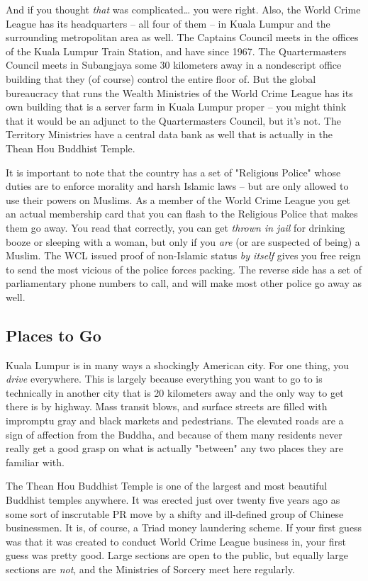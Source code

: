 And if you thought \textit{that} was complicated\ldots{} you were right. Also, the World Crime League has its headquarters -- all four of them -- in Kuala Lumpur and the surrounding metropolitan area as well. The Captains Council meets in the offices of the Kuala Lumpur Train Station, and have since 1967. The Quartermasters Council meets in Subangjaya some 30 kilometers away in a nondescript office building that they (of course) control the entire floor of. But the global bureaucracy that runs the Wealth Ministries of the World Crime League has its own building that is a server farm in Kuala Lumpur proper -- you might think that it would be an adjunct to the Quartermasters Council, but it's not. The Territory Ministries have a central data bank as well that is actually in the Thean Hou Buddhist Temple.

It is important to note that the country has a set of "Religious Police" whose duties are to enforce morality and harsh Islamic laws -- but are only allowed to use their powers on Muslims. As a member of the World Crime League you get an actual membership card that you can flash to the Religious Police that makes them go away. You read that correctly, you can get \textit{thrown in jail} for drinking booze or sleeping with a woman, but only if you \textit{are} (or are suspected of being) a Muslim. The WCL issued proof of non-Islamic status \textit{by itself} gives you free reign to send the most vicious of the police forces packing. The reverse side has a set of parliamentary phone numbers to call, and will make most other police go away as well.

\subsection{Places to Go}

\hspace{\parindent} Kuala Lumpur is in many ways a shockingly American city. For one thing, you \textit{drive} everywhere. This is largely because everything you want to go to is technically in another city that is 20 kilometers away and the only way to get there is by highway. Mass transit blows, and surface streets are filled with impromptu gray and black markets and pedestrians. The elevated roads are a sign of affection from the Buddha, and because of them many residents never really get a good grasp on what is actually "between" any two places they are familiar with. 

The Thean Hou Buddhist Temple is one of the largest and most beautiful Buddhist temples anywhere. It was erected just over twenty five years ago as some sort of inscrutable PR move by a shifty and ill-defined group of Chinese businessmen. It is, of course, a Triad money laundering scheme. If your first guess was that it was created to conduct World Crime League business in, your first guess was pretty good. Large sections are open to the public, but equally large sections are \textit{not}, and the Ministries of Sorcery meet here regularly.

